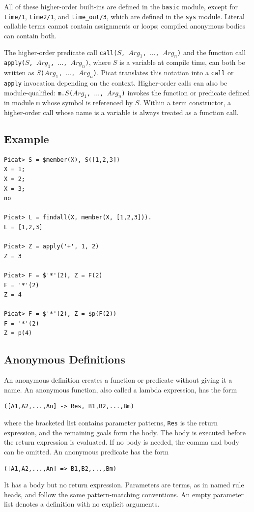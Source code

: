 All of these higher-order built-ins are defined in the {\tt basic} module, except for \texttt{time/1}, \texttt{time2/1}, and \texttt{time\_out/3}, which are defined in the {\tt sys} module. Literal callable terms cannot contain assignments or loops; compiled anonymous bodies can contain both.

The higher-order predicate call \texttt{call($S$, $Arg_1$, $\ldots$, $Arg_n$)} and the function call \newline \texttt{apply($S$, $Arg_1$, $\ldots$, $Arg_n$)}, where $S$ is a variable at compile time, can both be written as \texttt{$S$($Arg_1$, $\ldots$, $Arg_n$)}. Picat translates this notation into a \texttt{call} or \texttt{apply} invocation depending on the context. Higher-order calls can also be module-qualified: \texttt{m.$S$($Arg_1$, $\ldots$, $Arg_n$)} invokes the function or predicate defined in module \texttt{m} whose symbol is referenced by $S$. Within a term constructor, a higher-order call whose name is a variable is always treated as a function call.

\subsection*{Example}
\begin{verbatim}
Picat> S = $member(X), S([1,2,3])
X = 1;
X = 2;
X = 3;
no

Picat> L = findall(X, member(X, [1,2,3])).
L = [1,2,3]

Picat> Z = apply('+', 1, 2)
Z = 3

Picat> F = $'*'(2), Z = F(2)
F = '*'(2)
Z = 4

Picat> F = $'*'(2), Z = $p(F(2))
F = '*'(2)
Z = p(4)
\end{verbatim}

\subsection{Anonymous Definitions}
\label{section:overview-anonymous}
An anonymous definition creates a function or predicate without giving it a
name. An anonymous function, also called a lambda expression, has the form
\begin{verbatim}
([A1,A2,...,An] -> Res, B1,B2,...,Bm)
\end{verbatim}
where the bracketed list contains parameter patterns, \texttt{Res} is the
return expression, and the remaining goals form the body. The body is
executed before the return expression is evaluated. If no body is needed,
the comma and body can be omitted. An anonymous predicate has the form
\begin{verbatim}
([A1,A2,...,An] => B1,B2,...,Bm)
\end{verbatim}
It has a body but no return expression. Parameters are terms, as in named
rule heads, and follow the same pattern-matching conventions. An empty
parameter list denotes a definition with no explicit arguments.

